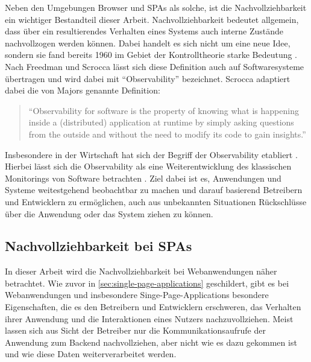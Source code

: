 Neben den Umgebungen Browser und SPAs als solche, ist die Nachvollziehbarkeit ein wichtiger Bestandteil dieser Arbeit. Nachvollziehbarkeit bedeutet allgemein, dass über ein resultierendes Verhalten eines Systems auch interne Zustände nachvollzogen werden können. Dabei handelt es sich nicht um eine neue Idee, sondern sie fand bereits 1960 im Gebiet der Kontrolltheorie starke Bedeutung \cite{OnTheGeneralTheoryOfControlSystems}. Nach Freedman \cite{TestabilityOfSoftwareComponents} und Scrocca \etal \cite{TheKaijuProjectPaper} lässt sich diese Definition auch auf Softwaresysteme übertragen und wird dabei mit \enquote{Observability} bezeichnet. Scrocca adaptiert dabei die von Majors \cite{MajorsObservability} genannte Definition:

\begin{quotation}
\enquote{Observability for software is the property of knowing what is happening inside a (distributed) application at runtime by simply asking questions from the outside and without the need to modify its code to gain insights.}
\end{quotation}

Insbesondere in der Wirtschaft hat sich der Begriff der Observability etabliert \cite{DynatraceObservability} \cite{NewRelicObservability}. Hierbei lässt sich die Observability als eine Weiterentwicklung des klassischen Monitorings von Software betrachten \cite{TheNewStackMonitoringAndObservability}. Ziel dabei ist es, Anwendungen und Systeme weitestgehend beobachtbar zu machen und darauf basierend Betreibern und Entwicklern zu ermöglichen, auch aus unbekannten Situationen Rückschlüsse über die Anwendung oder das System ziehen zu können.

\subsection{Nachvollziehbarkeit bei SPAs}
\label{sec:nachvollziehbarkeit-bei-spas}

In dieser Arbeit wird die Nachvollziehbarkeit bei Webanwendungen näher betrachtet. Wie zuvor in \autoref{sec:single-page-applications} geschildert, gibt es bei Webanwendungen und insbesondere Singe-Page-Applications besondere Eigenschaften, die es den Betreibern und Entwicklern erschweren, das Verhalten ihrer Anwendung und die Interaktionen eines Nutzers nachzuvollziehen. Meist lassen sich aus Sicht der Betreiber nur die Kommunikationsaufrufe der Anwendung zum Backend nachvollziehen, aber nicht wie es dazu gekommen ist und wie diese Daten weiterverarbeitet werden.

